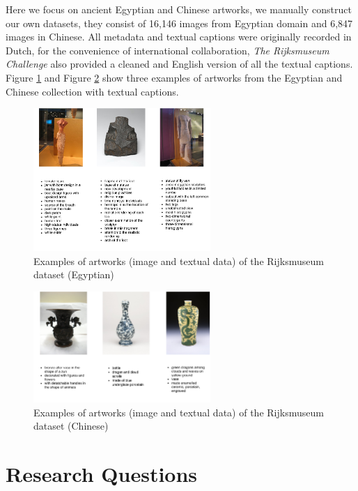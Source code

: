 Here we focus on ancient Egyptian and Chinese artworks, we manually construct our own datasets, they consist of 16,146 images from Egyptian domain and 6,847 images in Chinese. All metadata and textual
captions were originally recorded in Dutch, for the convenience of international collaboration, \textit{The Rijksmuseum Challenge} \cite{MensinkICMIR2014} also provided a cleaned and English version of all the textual captions. Figure \ref{fig:sampleEgyptian} and Figure \ref{fig:sampleChinese} show three examples of artworks from the Egyptian and Chinese collection with textual captions.

\begin{figure}[h!]
\centering
\includegraphics[width=0.6\textwidth]{egyptian.pdf}
\caption{Examples of artworks (image and textual data) of the Rijksmuseum dataset (Egyptian) \cite{MensinkICMIR2014}}
\label{fig:sampleEgyptian}
\end{figure}

\begin{figure}[h!]
\centering
\includegraphics[width=0.6\textwidth]{chinese.pdf}
\caption{Examples of artworks (image and textual data) of the Rijksmuseum dataset (Chinese) \cite{MensinkICMIR2014}}
\label{fig:sampleChinese}
\end{figure}

\section{Research Questions}

